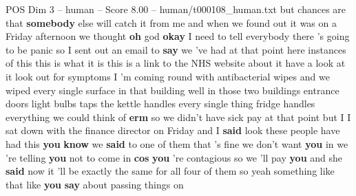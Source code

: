 \begin{textsample}{POS Dim 3 – human – Score 8.00 – human/t000108\_human.txt}  \label{ex:f3_pos_005}
but chances are that \textbf{somebody} else will catch it from me and when we found out it was on a Friday afternoon we thought \textbf{oh} god \textbf{okay} I need to tell everybody there 's going to be panic so I sent out an email to \textbf{say} we 've had at that point here instances of this this is what it is this is a link to the NHS website about it have a look at it look out for symptoms I 'm coming round with antibacterial wipes and we wiped every single surface in that building well in those two buildings entrance doors light bulbs taps the kettle handles every single thing fridge handles everything we could think of \textbf{erm} so we didn't have sick pay at that point but I I sat down with the finance director on Friday and I \textbf{said} look these people have had this \textbf{you} \textbf{know} we \textbf{said} to one of them that 's fine we don't want \textbf{you} in we 're telling \textbf{you} not to come in \textbf{cos} \textbf{you} 're contagious so we 'll pay \textbf{you} and she \textbf{said} now it 'll be exactly the same for all four of them so yeah something like that like \textbf{you} \textbf{say} about passing things on

\end{textsample}
